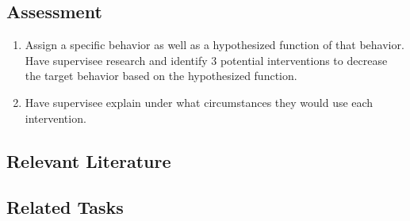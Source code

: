 \subsection{Assessment}
\begin{enumerate}
\item Assign a specific behavior as well as a hypothesized function of that behavior. Have supervisee research and identify 3 potential interventions to decrease the target behavior based on the hypothesized function. 
\item Have supervisee explain under what circumstances they would use each intervention.
%
\end{enumerate}
%
\subsection{Relevant Literature}
\begin{refsection}
\nocite{test,alang2017police,clayton2018black}
\printbibliography[heading=none]
\end{refsection}
%
\subsection{Related Tasks}
\foureOne{}\\
\fouriOne{}\\
\fouriTwo{}\\
\fouriFour{}\\
\fouriSix{}\\
\fourjOne{}\\
\fourjTwo{}\\
\fourjTen{}\\
%
%
%
%
%
%
%
%
%
\section[\fourjThree{}]{\fourjThree{}%
              }
